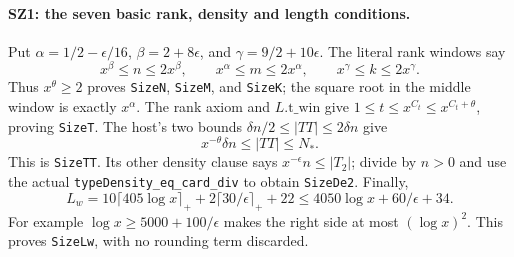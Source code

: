 \documentclass[11pt,a4paper]{article}
\numberwithin{equation}{section}
\theoremstyle{remark}\newtheorem{remark}[theorem]{Remark}
\begin{document}
\paragraph{SZ1: the seven basic rank, density and length conditions.}
Put $\alpha=1/2-\epsilon/16$, $\beta=2+8\epsilon$, and
$\gamma=9/2+10\epsilon$. The literal rank windows say
\[
 x^\beta\leq n\leq2x^\beta,\qquad
 x^\alpha\leq m\leq2x^\alpha,\qquad
 x^\gamma\leq k\leq2x^\gamma.                                  \tag{SZ.3}
\]
Thus $x^\theta\geq2$ proves \texttt{SizeN}, \texttt{SizeM}, and
\texttt{SizeK}; the square root in the middle window is exactly
$x^\alpha$. The rank axiom and $L.\mathrm{t\_win}$ give
$1\leq t\leq x^{C_t}\leq x^{C_t+\theta}$, proving
\texttt{SizeT}. The host's two bounds
$\delta n/2\leq|TT|\leq2\delta n$ give
\[
       x^{-\theta}\delta n\leq |TT|\leq N_*.
\]
This is \texttt{SizeTT}. Its other density clause says
$x^{-\epsilon}n\leq |T_2|$; divide by $n>0$ and use the actual
\texttt{typeDensity\_\allowbreak eq\_\allowbreak card\_\allowbreak div} to obtain
\texttt{SizeDe2}. Finally,
\[
 L_w=10\lceil405\log x\rceil_+
             +2\lceil30/\epsilon\rceil_++22
       \leq4050\log x+60/\epsilon+34.
\]
For example $\log x\geq5000+100/\epsilon$ makes the right side
at most $(\log x)^2$. This proves \texttt{SizeLw}, with no rounding
term discarded.
\end{document}
